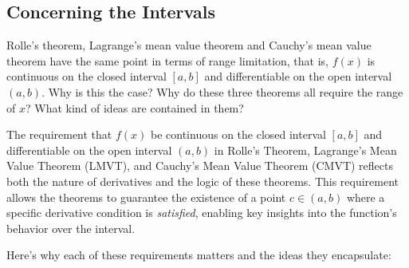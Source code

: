 \documentclass[a4paper,12pt]{book}
\begin{document}
\subsection{Concerning the Intervals}

\begin{bluebox}
Rolle's theorem, Lagrange's mean value theorem and Cauchy's mean value theorem have the same point in terms of range limitation, that is, \(f(x)\) is continuous on the closed interval \([a,b]\) and differentiable on the open interval \((a,b)\). Why is this the case? Why do these three theorems all require the range of \(x\)? What kind of ideas are contained in them?
\end{bluebox}

The requirement that \( f(x) \) be continuous on the closed interval \([a, b]\) and differentiable on the open interval \((a, b)\) in Rolle's Theorem, Lagrange's Mean Value Theorem (LMVT), and Cauchy's Mean Value Theorem (CMVT) reflects both the nature of derivatives and the logic of these theorems. This requirement allows the theorems to guarantee the existence of a point \( c \in (a, b) \) where a specific derivative condition is \textit{satisfied}, enabling key insights into the function’s behavior over the interval.

Here's why each of these requirements matters and the ideas they encapsulate:
\end{document}
